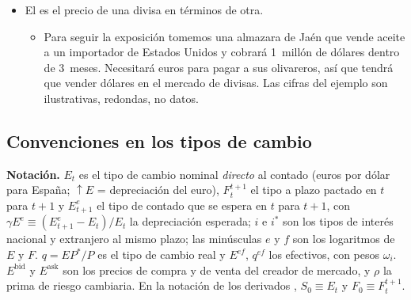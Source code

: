 \documentclass[11pt]{article}
\begin{document}
\begin{itemize}
  \begin{itemize}
  \item Como cualquier mercado de la teoría económica, no es un lugar físico: es una red de bancos, brókeres, plataformas electrónicas y otros agentes autorizados, a los que acuden empresas, inversores y bancos centrales.
  \item Es internacional, aunque se hable de las \emph{plazas} (Londres, Nueva York, Singapur, Hong Kong, Tokio, Zúrich, Fráncfort…) en las que cotizan los tipos de cambio.
  \item Cumple 3~\emph{funciones}:
    \begin{enumerate}
    \item \emph{transferir poder adquisitivo} de una moneda a otra, y con él de un país a otro;
    \item \emph{financiar el comercio internacional} con crédito a corto plazo en divisas, mientras las mercancías están en tránsito;
    \item \emph{facilitar la cobertura del riesgo de cambio} con los instrumentos a plazo (\ref{sec:op-cobertura}).
    \end{enumerate}
  \end{itemize}
\item El  es el precio de una divisa en términos de otra.
  \begin{itemize}
  \item Para seguir la exposición tomemos una almazara de Jaén que vende aceite a un importador de Estados Unidos y cobrará 1~millón de dólares dentro de 3~meses. Necesitará euros para pagar a sus olivareros, así que tendrá que vender dólares en el mercado de divisas. Las cifras del ejemplo son ilustrativas, redondas, no datos.
  \end{itemize}
\end{itemize}

\subsection{Convenciones en los tipos de cambio}\label{sec:convenciones}

\begin{anotaciones}
\textbf{Notación.} $E_t$ es el tipo de cambio nominal \emph{directo} al contado (euros por dólar para España; $\uparrow E$ = depreciación del euro), $F_t^{t+1}$ el tipo a plazo pactado en $t$ para $t+1$ y $E^e_{t+1}$ el tipo de contado que se espera en $t$ para $t+1$, con $\gamma E^e\equiv(E^e_{t+1}-E_t)/E_t$ la depreciación esperada; $i$ e $i^{*}$ son los tipos de interés nacional y extranjero al mismo plazo; las minúsculas $e$ y $f$ son los logaritmos de $E$ y $F$. $q=EP^{*}/P$ es el tipo de cambio real y $E^{ef}$, $q^{ef}$ los efectivos, con pesos $\omega_i$. $E^{\mathrm{bid}}$ y $E^{\mathrm{ask}}$ son los precios de compra y de venta del creador de mercado, y $\rho$ la prima de riesgo cambiaria. En la notación de los derivados , $S_0\equiv E_t$ y $F_0\equiv F_t^{t+1}$.
\end{anotaciones}
\end{document}
